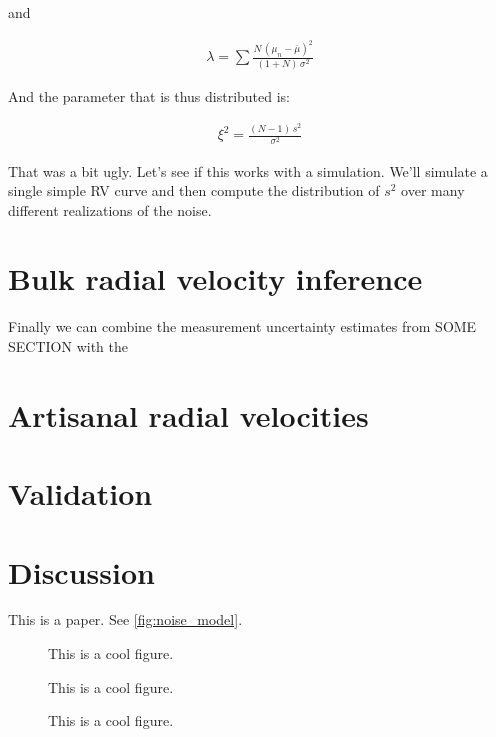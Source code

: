 \documentclass[modern, letterpaper]{aastex63}
\begin{document}
and

\begin{eqnarray}
  \lambda = \sum \frac{N\,(\mu_n - \bar{\mu})^2}{(1 + N)\,\sigma^2}
\end{eqnarray}

And the parameter that is thus distributed is:

\begin{eqnarray}
  \xi^2 = \frac{(N - 1)\,s^2}{\sigma^2}
\end{eqnarray}

That was a bit ugly.
Let's see if this works with a simulation.
We'll simulate a single simple RV curve and then compute the distribution of $s^2$ over many different realizations of the noise.

\section{Bulk radial velocity inference}

Finally we can combine the measurement uncertainty estimates from SOME SECTION with the

\section{Artisanal radial velocities}

\section{Validation}

\section{Discussion}

This is a paper.
See \autoref{fig:noise_model}.

\begin{figure}
  \caption{This is a cool figure. \label{fig:noise_model}}
\end{figure}

\begin{figure}
  \caption{This is a cool figure. \label{fig:sigma_cmd}}
\end{figure}

\begin{figure}
  \caption{This is a cool figure. \label{fig:p_value_dist}}
\end{figure}
\end{document}
